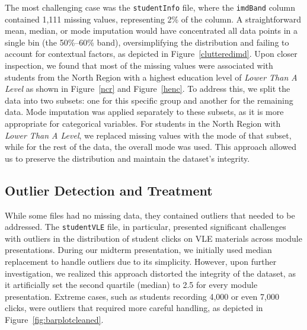 The most challenging case was the \texttt{studentInfo} file, where the \texttt{imdBand} column contained 1,111 missing values, representing 2\% of the column. A straightforward mean, median, or mode imputation would have concentrated all data points in a single bin (the 50\%–60\% band), oversimplifying the distribution and failing to account for contextual factors, as depicted in Figure~\ref{clutteredimd}. Upon closer inspection, we found that most of the missing values were associated with students from the North Region with a highest education level of \textit{Lower Than A Level} as shown in Figure~\ref{ncr} and Figure~\ref{henc}. To address this, we split the data into two subsets: one for this specific group and another for the remaining data. Mode imputation was applied separately to these subsets, as it is more appropriate for categorical variables. For students in the North Region with \textit{Lower Than A Level}, we replaced missing values with the mode of that subset, while for the rest of the data, the overall mode was used. This approach allowed us to preserve the distribution and maintain the dataset's integrity.

\subsection*{Outlier Detection and Treatment}

While some files had no missing data, they contained outliers that needed to be addressed. The \texttt{studentVLE} file, in particular, presented significant challenges with outliers in the distribution of student clicks on VLE materials across module presentations. During our midterm presentation, we initially used median replacement to handle outliers due to its simplicity. However, upon further investigation, we realized this approach distorted the integrity of the dataset, as it artificially set the second quartile (median) to 2.5 for every module presentation. Extreme cases, such as students recording 4,000 or even 7,000 clicks, were outliers that required more careful handling, as depicted in Figure~\ref{fig:barplotcleaned}.

